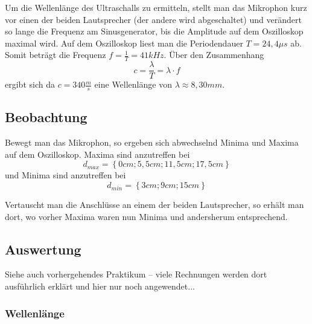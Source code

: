 Um die Wellenlänge des Ultraschalls zu ermitteln, stellt man das Mikrophon kurz vor einen der beiden Lautsprecher (der andere wird abgeschaltet) und verändert so lange die Frequenz am Sinusgenerator, bis die Amplitude auf dem Oszilloskop maximal wird. Auf dem Oszilloskop liest man die Periodendauer \(T = 24,4 \mu s\) ab. Somit beträgt die Frequenz \(f = \frac{1}{T} = 41kHz\). Über den Zusammenhang 
\begin{equation}
   c = \frac{\lambda}{T} = \lambda \cdot f
   \label{eq_c=lf}
\end{equation}
ergibt sich da \(c = 340 \frac{m}{s}\) eine Wellenlänge von \(\lambda \approx 8,30mm\).





		\subsection{Beobachtung}

Bewegt man das Mikrophon, so ergeben sich abwechselnd Minima und Maxima auf dem Oszilloskop. Maxima sind anzutreffen bei
\[d_{max} = \left \{ 0cm; 5,5cm; 11,5cm; 17,5cm \right \}\]
und Minima sind anzutreffen bei
\[d_{min} = \left \{ 3cm; 9cm; 15cm \right \}\]

Vertauscht man die Anschlüsse an einem der beiden Lautsprecher, so erhält man dort, wo vorher Maxima waren nun Minima und andersherum entsprechend.




		\subsection{Auswertung}

Siehe auch vorhergehendes Praktikum -- viele Rechnungen werden dort ausführlich erklärt und hier nur noch angewendet...


\subsubsection{Wellenlänge}
\label{kap_interferenz_auswertung_wellenlaenge}

